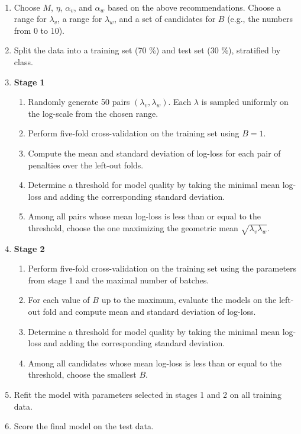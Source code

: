 \begin{algorithm}~
\label{alg_hyperparameters}
%
\begin{enumerate}
\item Choose $M$, $\eta$, $\alpha_v$, and $\alpha_w$ based on the above recommendations.
Choose a range for $\lambda_v$, a range for $\lambda_w$, and a set of candidates for $B$ (e.g., the numbers from 0 to 10).
%
\item Split the data into a training set (70 \%) and test set (30 \%), stratified by class.
%
\item\textbf{Stage 1}
%
\begin{enumerate}
\item Randomly generate 50 pairs $(\lambda_v,\lambda_w)$.
Each $\lambda$ is sampled uniformly on the log-scale from the chosen range.
%
\item Perform five-fold cross-validation on the training set using $B=1$.
%
\item Compute the mean and standard deviation of log-loss for each pair of penalties over the left-out folds.
%
\item Determine a threshold for model quality by taking the minimal mean log-loss and adding the corresponding standard deviation.
%
\item Among all pairs whose mean log-loss is less than or equal to the threshold, choose the one maximizing the geometric mean $\sqrt{\lambda_v\lambda_w}$.
\end{enumerate}
%
\item\textbf{Stage 2}
\begin{enumerate}
\item Perform five-fold cross-validation on the training set using the parameters from stage 1 and the maximal number of batches.
%
\item For each value of $B$ up to the maximum, evaluate the models on the left-out fold and compute mean and standard deviation of log-loss.
%
\item Determine a threshold for model quality by taking the minimal mean log-loss and adding the corresponding standard deviation.
%
\item Among all candidates whose mean log-loss is less than or equal to the threshold, choose the smallest $B$.
\end{enumerate}
%
\item Refit the model with parameters selected in stages 1 and 2 on all training data.
%
\item Score the final model on the test data.
\end{enumerate}
\end{algorithm}
